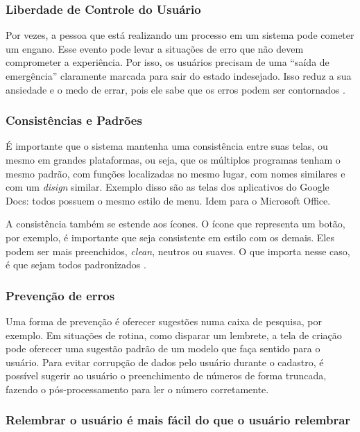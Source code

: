 \subsubsection{Liberdade de Controle do Usuário}

Por vezes, a pessoa que está realizando um processo em um sistema pode cometer um engano. Esse evento pode levar a situações de erro que não devem comprometer a experiência. Por isso, os usuários precisam de uma “saída de emergência” claramente marcada para sair do estado indesejado. Isso reduz a sua ansiedade e o medo de errar, pois ele sabe que os erros podem ser contornados \cite{BarbosaEtAl2021InteracaoHumanoComputadorExperiencia}.

\subsubsection{Consistências e Padrões}

É importante que o sistema mantenha uma consistência entre suas telas, ou mesmo em grandes plataformas, ou seja, que os múltiplos programas tenham o mesmo padrão, com funções localizadas no mesmo lugar, com nomes similares e com um \textit{disign} similar. Exemplo disso são as telas dos aplicativos do Google Docs: todos possuem o mesmo estilo de menu. Idem para o Microsoft Office.

A consistência também se estende aos ícones. O ícone que representa um botão, por exemplo, é importante que seja consistente em estilo com os demais. Eles podem ser mais preenchidos, \textit{clean}, neutros ou suaves. O que importa nesse caso, é que sejam todos padronizados \cite{site:nielsenIcon}.


\subsubsection{Prevenção de erros}

Uma forma de prevenção é oferecer sugestões numa caixa de pesquisa, por exemplo. Em situações de rotina, como disparar um lembrete, a tela de criação pode oferecer uma sugestão padrão de um modelo que faça sentido para o usuário. Para evitar corrupção de dados pelo usuário durante o cadastro, é possível sugerir ao usuário o preenchimento de números de forma truncada, fazendo o pós-processamento para ler o número corretamente.

\subsubsection{Relembrar o usuário é mais fácil do que o usuário relembrar}

